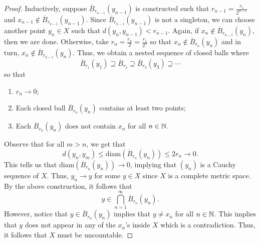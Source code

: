 \documentclass[a4paper]{article}
\begin{document}
\begin{proof}
Inductively, suppose \( \overline{B}_{{r}_{n-1}}({y}_{n-1}) \) is constructed such that \( {r}_{n-1} = \frac{ {r}_{1} }{  2^{n-1} }  \) and \( {x}_{n-1} \notin \overline{B}_{{r}_{n-1}}({y}_{n-1}) \). Since \( \overline{B}_{{r}_{n-1}}({y}_{n-1}) \) is not a singleton, we can choose another point \( {y}_{n} \in X  \) such that \( d({y}_{n}, {y}_{n-1}) < {r}_{n-1} \). Again, if \( {x}_{n} \notin \overline{B}_{{r}_{n-1}}({y}_{n}) \), then we are done. Otherwise, take \( {r}_{n} = \frac{ {r}_{n} }{ 2 }  = \frac{ {r}_{1} }{ 2^{n} }  \) so that \( {x}_{n} \notin \overline{B}_{{r}_{n}}({y}_{n}) \) and in turn, \( {x}_{n} \notin \overline{B}_{{r}_{n-1}}({y}_{n}) \). Thus, we obtain a nested sequence of closed balls where
\[ \overline{B}_{{r}_{1}}({y}_{1}) \supseteq \overline{B}_{{r}_{2}} \supseteq \overline{B}_{{r}_{3}}({y}_{3}) \supseteq \cdots \]
so that 
\begin{enumerate}
    \item[(1)] \( {r}_{n} \to  0 \);
    \item[(2)] Each closed ball \( \overline{B}_{{r}_{n}}({y}_{n}) \) contains at least two points; 
    \item[(3)] Each \( \overline{B}_{{r}_{n}}({y}_{n})  \) does not contain \( {x}_{n} \) for all \( n \in \mathbb{N} \).
\end{enumerate}

Observe that for all \( m > n  \), we get that 
\[  d({y}_{n}, {y}_{m}) \leq \text{diam}(\overline{B}_{{r}_{n}}({y}_{n})) \leq 2 {r}_{n} \to 0.   \]
This tells us that \( \text{diam}(\overline{B}_{{r}_{n}}({y}_{n})) \to 0   \), implying that \( ({y}_{n}) \) is a Cauchy sequence of \( X  \). Thus, \( {y}_{n} \to y  \) for some \( y \in X  \) since \( X  \) is a complete metric space. By the above construction, it follows that 
\[  y \in \bigcap_{ n=1  }^{ \infty  }  \overline{B}_{{r}_{n}} ({y}_{n}). \]
However, notice that \( y \in \overline{B}_{{r}_{n}}({y}_{n}) \) implies that \( y \neq {x}_{n} \) for all \( n \in \mathbb{N}  \). This implies that \( y  \) does not appear in any of the \( {x}_{n} \)'s inside \( X  \) which is a contradiction. Thus, it follows that \( X  \) must be uncountable.


\end{proof}
\end{document}
